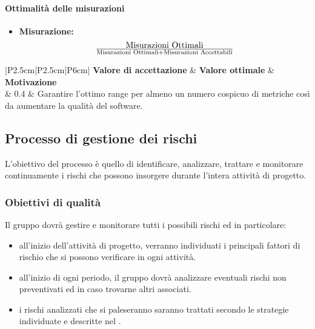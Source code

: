 \paragraph{Ottimalità delle misurazioni}

\begin{itemize}
\item \textbf{Misurazione:} 
\begin{displaymath}
{\text{Misurazioni Ottimali}}\over{\text{Misurazioni Ottimali} + \text{Misurazioni Accettabili}}
\end{displaymath} 
\end{itemize}

\begin{center}
	\begin{tabular}{|P{2.5cm}|P{2.5cm}|P{6cm}|}
		\hline
			\textbf{Valore di accettazione}	& \textbf{Valore ottimale} & \textbf{Motivazione} \\
			 & 0.4 & Garantire l'ottimo range per almeno un numero cospicuo di metriche così da aumentare la qualità del software. \\
			\hline
			\end{tabular}
\end{center}

\subsection{Processo di gestione dei rischi}
L'obiettivo del processo è quello di identificare, analizzare, trattare e monitorare continuamente i rischi che possono insorgere durante l'intera attività di progetto.

\subsubsection{Obiettivi di qualità}
Il gruppo dovrà gestire e monitorare tutti i possibili rischi ed in particolare:

\begin{itemize}
\item all'inizio dell'attività di progetto, verranno individuati i principali fattori di rischio che si possono verificare in ogni attività.
\item all'inizio di ogni periodo, il gruppo dovrà analizzare eventuali rischi non preventivati ed in caso trovarne altri associati.
\item i rischi analizzati che si paleseranno saranno trattati secondo le strategie individuate e descritte nel \PdP.
\end{itemize}

